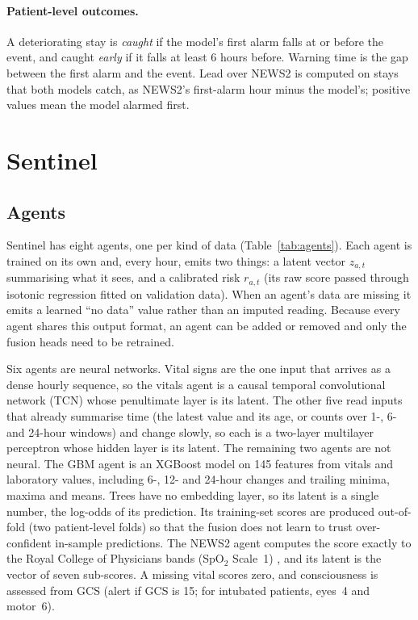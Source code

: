 \documentclass[11pt]{article}
\begin{document}
\paragraph{Patient-level outcomes.}
A deteriorating stay is \emph{caught} if the model's first alarm falls at or
before the event, and caught \emph{early} if it falls at least 6 hours before.
Warning time is the gap between the first alarm and the event. Lead over
NEWS2 is computed on stays that both models catch, as NEWS2's first-alarm hour
minus the model's; positive values mean the model alarmed first.

\section{Sentinel}\label{sec:method}

\subsection{Agents}
Sentinel has eight agents, one per kind of data (Table~\ref{tab:agents}). Each
agent is trained on its own and, every hour, emits two things: a latent vector
$z_{a,t}$ summarising what it sees, and a calibrated risk $r_{a,t}$ (its raw
score passed through isotonic regression \cite{zadrozny2002calibration} fitted
on validation data). When an agent's data are missing it emits a learned
``no data'' value rather than an imputed reading. Because every agent shares
this output format, an agent can be added or removed and only the fusion
heads need to be retrained.

Six agents are neural networks. Vital signs are the one input that arrives as
a dense hourly sequence, so the vitals agent is a causal temporal
convolutional network (TCN) \cite{bai2018tcn,oord2016wavenet} whose
penultimate layer is its latent. The other five read inputs that already
summarise time (the latest value and its age, or counts over 1-, 6- and
24-hour windows) and change slowly, so each is a two-layer multilayer
perceptron whose hidden layer is its latent. The remaining two agents are not
neural. The GBM agent is an XGBoost model \cite{chen2016xgboost} on 145
features from vitals and laboratory values, including 6-, 12- and 24-hour
changes and trailing minima, maxima and means. Trees have no embedding layer,
so its latent is a single number, the log-odds of its prediction. Its
training-set scores are produced out-of-fold (two patient-level folds) so that
the fusion does not learn to trust over-confident in-sample predictions. The
NEWS2 agent computes the score exactly to the Royal College of Physicians
bands (SpO$_2$ Scale~1) \cite{rcp2017news2}, and its latent is the vector of
seven sub-scores. A missing vital scores zero, and consciousness is assessed
from GCS (alert if GCS is 15; for intubated patients, eyes~4 and motor~6).
\end{document}
